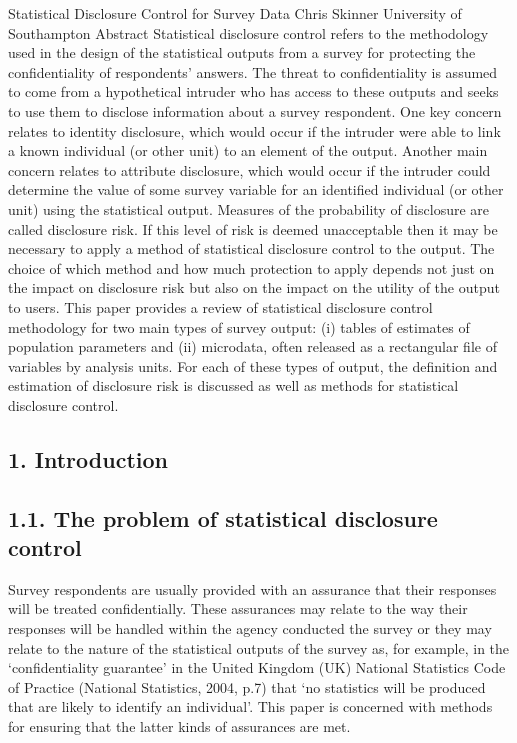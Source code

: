 Statistical Disclosure Control for Survey Data
Chris Skinner
University of Southampton
Abstract
Statistical disclosure control refers to the methodology used in the design of the statistical
outputs from a survey for protecting the confidentiality of respondents’ answers. The
threat to confidentiality is assumed to come from a hypothetical intruder who has access
to these outputs and seeks to use them to disclose information about a survey respondent.
One key concern relates to identity disclosure, which would occur if the intruder were
able to link a known individual (or other unit) to an element of the output. Another main
concern relates to attribute disclosure, which would occur if the intruder could determine
the value of some survey variable for an identiﬁed individual (or other unit) using the
statistical output. Measures of the probability of disclosure are called disclosure risk. If
this level of risk is deemed unacceptable then it may be necessary to apply a method of
statistical disclosure control to the output. The choice of which method and how much
protection to apply depends not just on the impact on disclosure risk but also on the
impact on the utility of the output to users. This paper provides a review of statistical
disclosure control methodology for two main types of survey output: (i) tables of
estimates of population parameters and (ii) microdata, often released as a rectangular ﬁle
of variables by analysis units. For each of these types of output, the definition and
estimation of disclosure risk is discussed as well as methods for statistical disclosure
control.
\subsection*{1. Introduction}
\subsection*{1.1. The problem of statistical disclosure control}
Survey respondents are usually provided with an assurance that their responses will
be treated confidentially. These assurances may relate to the way their responses will be
handled within the agency conducted the survey or they may relate to the nature of the
statistical outputs of the survey as, for example, in the ‘confidentiality guarantee’ in the
United Kingdom (UK) National Statistics Code of Practice (National Statistics, 2004,
p.7) that ‘no statistics will be produced that are likely to identify an individual’. This
paper is concerned with methods for ensuring that the latter kinds of assurances are met.

